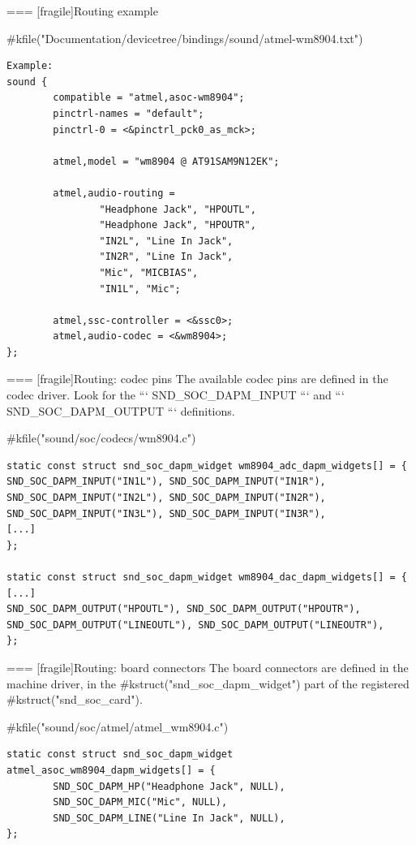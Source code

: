 === [fragile]{Routing example}
  \begin{block}{#kfile("Documentation/devicetree/bindings/sound/atmel-wm8904.txt")}
    \fontsize{8}{8}\selectfont
    \begin{verbatim}
Example:
sound {
        compatible = "atmel,asoc-wm8904";
        pinctrl-names = "default";
        pinctrl-0 = <&pinctrl_pck0_as_mck>;

        atmel,model = "wm8904 @ AT91SAM9N12EK";

        atmel,audio-routing =
                "Headphone Jack", "HPOUTL",
                "Headphone Jack", "HPOUTR",
                "IN2L", "Line In Jack",
                "IN2R", "Line In Jack",
                "Mic", "MICBIAS",
                "IN1L", "Mic";

        atmel,ssc-controller = <&ssc0>;
        atmel,audio-codec = <&wm8904>;
};
    \end{verbatim}
  \end{block}


=== [fragile]{Routing: codec pins}
  The available codec pins are defined in the codec driver. Look for
  the ``` SND_SOC_DAPM_INPUT ``` and ``` SND_SOC_DAPM_OUTPUT ```
  definitions.

  \begin{block}{#kfile("sound/soc/codecs/wm8904.c")}
    \fontsize{8}{8}\selectfont
    \begin{verbatim}
static const struct snd_soc_dapm_widget wm8904_adc_dapm_widgets[] = {
SND_SOC_DAPM_INPUT("IN1L"), SND_SOC_DAPM_INPUT("IN1R"), SND_SOC_DAPM_INPUT("IN2L"), SND_SOC_DAPM_INPUT("IN2R"), SND_SOC_DAPM_INPUT("IN3L"), SND_SOC_DAPM_INPUT("IN3R"),
[...]
};

static const struct snd_soc_dapm_widget wm8904_dac_dapm_widgets[] = {
[...]
SND_SOC_DAPM_OUTPUT("HPOUTL"), SND_SOC_DAPM_OUTPUT("HPOUTR"), SND_SOC_DAPM_OUTPUT("LINEOUTL"), SND_SOC_DAPM_OUTPUT("LINEOUTR"),
};
    \end{verbatim}
  \end{block}


=== [fragile]{Routing: board connectors}
  The board connectors are defined in the machine driver, in the
  #kstruct("snd_soc_dapm_widget") part of the registered
  #kstruct("snd_soc_card").
  \begin{block}{#kfile("sound/soc/atmel/atmel_wm8904.c")}
    \fontsize{10}{10}\selectfont
    \begin{verbatim}
static const struct snd_soc_dapm_widget atmel_asoc_wm8904_dapm_widgets[] = {
        SND_SOC_DAPM_HP("Headphone Jack", NULL),
        SND_SOC_DAPM_MIC("Mic", NULL),
        SND_SOC_DAPM_LINE("Line In Jack", NULL),
};
    \end{verbatim}
  \end{block}


